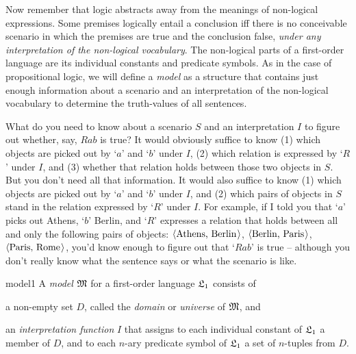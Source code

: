%
%

Now remember that logic abstracts away from the meanings of non-logical expressions.
Some premises logically entail a conclusion
iff there is no conceivable scenario in which
the premises are true and the conclusion false,
\emph{under any interpretation of the non-logical vocabulary}.
The non-logical parts of a first-order language are
its individual constants and predicate symbols.
As in the case of propositional logic,
we will define a \emph{model} as a structure
that contains just enough information about
a scenario and an interpretation of the non-logical vocabulary
to determine the truth-values of all sentences.

What do you need to know about a scenario $S$ and an interpretation $I$
to figure out whether, say, $Rab$ is true?
It would obviously suffice to know
(1) which objects are picked out by `$a$' and `$b$' under $I$,
(2) which relation is expressed by `$R$' under $I$,
and (3) whether that relation holds between those two objects in $S$.
But you don't need all that information.
It would also suffice to know
(1) which objects are picked out by `$a$' and `$b$' under $I$,
and (2) which pairs of objects in $S$ stand in the relation expressed by `$R$' under $I$.
For example,
if I told you that
`$a$' picks out Athens,
`$b$' Berlin,
and `$R$' expresses a relation that holds between all and only the following pairs of objects: $\t{\text{Athens, Berlin}}$, $\t{\text{Berlin, Paris}}$, $\t{\text{Paris, Rome}}$,
you'd know enough to figure out that `$Rab$' is true
-- although you don't really know what the sentence says
or what the scenario is like.

\begin{definition}{}{model1}
  A \emph{model} $\mathfrak{M}$ for a first-order language $\mathfrak{L}_{1}$ consists of
  \begin{cenumerate}
    \item[(i)] a non-empty set $D$, called the \emph{domain} or \emph{universe} of $\mathfrak{M}$, and
    \item[(ii)] an \emph{interpretation function} $I$ that assigns
      to each individual constant of $\mathfrak{L}_{1}$ a member of $D$, and
      to each $n$-ary predicate symbol of $\mathfrak{L}_{1}$ a set of $n$-tuples from $D$.
  \end{cenumerate}
\end{definition}

